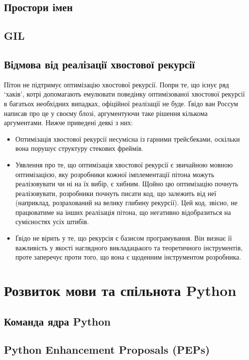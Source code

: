 \documentclass[a4paper, 12pt]{article}
\begin{document}
\subsection{Простори імен}

\subsection{GIL}

\subsection{Відмова від реалізації хвостової рекурсії}
Пітон не підтримує оптимізацію хвостової рекурсії. Попри те, що існує ряд `хаків', котрі допомагають емулювати поведінку оптимізованої хвостової рекурсії в багатьох необхідних випадках, офіційної реалізації не буде. Ґвідо ван Россум написав про це у своєму блозі, аргументуючи таке рішення кількома аргументами. Нижче приведені деякі з них:
 \begin{itemize}
    \item Оптимізація хвостової рекурсії несумісна із гарними трейсбеками, оскільки вона порушує структуру стекових фреймів.
    \item Уявлення про те, що оптимізація хвостової рекурсії є звичайною мовною оптимізацією, яку розробники кожної імплементації пітона можуть реалізовувати чи ні на їх вибір, є хибним. Щойно цю оптимізацію почнуть реалізовувати, розробники почнуть писати код, що залежить від неї (наприклад, розрахований на велику глибину рекурсії). Цей код, звісно, не працюватиме на інших реалізація пітона, що негативно відобразиться на сумісностях усіх штибів.
    \item Ґвідо не вірить у те, що рекурсія є базисом програмування. Він визнає її важливість у якості наглядного викладацького та теоретичного інструментів, проте заперечує проти того, що вона є щоденним інструментом розробника.
 \end{itemize}


\section{Розвиток мови та спільнота Python}

\subsection{Команда ядра Python}

\subsection{Python Enhancement Proposals (PEPs)}
\end{document}
